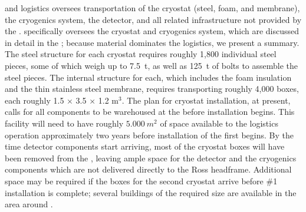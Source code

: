  and  logistics oversees transportation of the cryostat (steel, foam, and membrane), the cryogenics system, the detector, and all related infrastructure not provided by the . 
 specifically oversees the cryostat and cryogenics system, which are  discussed in detail in the  ; because  material dominates the logistics, we present a summary.  
The steel structure for each cryostat requires roughly 1,800 individual steel pieces,  some of which weigh up to \SI{7.5}{t}, as well as \SI{125}{t} of bolts to assemble the steel pieces. 
The internal structure for each, which includes the foam insulation and the thin stainless steel membrane, requires transporting roughly 4,000 boxes, 
 each roughly 1.5 $\times$ 3.5 $\times$ 1.2 m$^3$. 
 The plan for cryostat installation, at present, calls for all components to be warehoused at the  before installation begins. 
This facility will need to have roughly $\SI{5,000}{m^2}$ of space available to the logistics operation approximately two years before installation of the first  begins. 
By the time detector components start arriving, most of the cryostat boxes will have been removed from the , leaving ample space for the detector and the cryogenics components which are not delivered directly to the Ross headframe. 
Additional space may be required if the boxes for the second cryostat arrive before   \#1 installation is complete; several buildings of the required size are available in the area around . 

